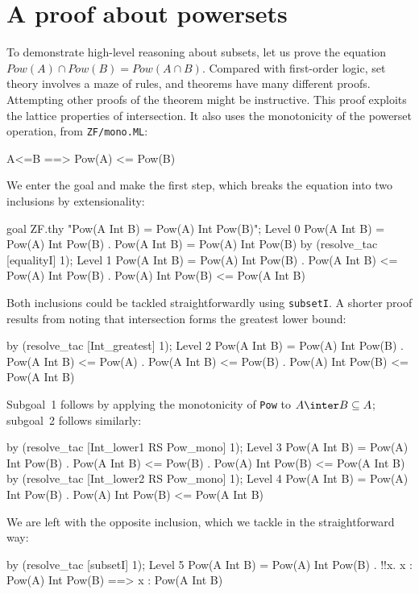 \section{A proof about powersets}
To demonstrate high-level reasoning about subsets, let us prove the equation
${Pow(A)\cap Pow(B)}= Pow(A\cap B)$.  Compared with first-order logic, set
theory involves a maze of rules, and theorems have many different proofs.
Attempting other proofs of the theorem might be instructive.  This proof
exploits the lattice properties of intersection.  It also uses the
monotonicity of the powerset operation, from {\tt ZF/mono.ML}:
\begin{ttbox}
      A<=B ==> Pow(A) <= Pow(B)
\end{ttbox}
We enter the goal and make the first step, which breaks the equation into
two inclusions by extensionality:
\begin{ttbox}
goal ZF.thy "Pow(A Int B) = Pow(A) Int Pow(B)";
{\out Level 0}
{\out Pow(A Int B) = Pow(A) Int Pow(B)}
{. Pow(A Int B) = Pow(A) Int Pow(B)}
by (resolve_tac [equalityI] 1);
{\out Level 1}
{\out Pow(A Int B) = Pow(A) Int Pow(B)}
{. Pow(A Int B) <= Pow(A) Int Pow(B)}
{. Pow(A) Int Pow(B) <= Pow(A Int B)}
\end{ttbox}
Both inclusions could be tackled straightforwardly using {\tt subsetI}.
A shorter proof results from noting that intersection forms the greatest
lower bound:
\begin{ttbox}
by (resolve_tac [Int_greatest] 1);
{\out Level 2}
{\out Pow(A Int B) = Pow(A) Int Pow(B)}
{. Pow(A Int B) <= Pow(A)}
{. Pow(A Int B) <= Pow(B)}
{. Pow(A) Int Pow(B) <= Pow(A Int B)}
\end{ttbox}
Subgoal~1 follows by applying the monotonicity of {\tt Pow} to $A\inter
B\subseteq A$; subgoal~2 follows similarly:
\begin{ttbox}
by (resolve_tac [Int_lower1 RS Pow_mono] 1);
{\out Level 3}
{\out Pow(A Int B) = Pow(A) Int Pow(B)}
{. Pow(A Int B) <= Pow(B)}
{. Pow(A) Int Pow(B) <= Pow(A Int B)}
by (resolve_tac [Int_lower2 RS Pow_mono] 1);
{\out Level 4}
{\out Pow(A Int B) = Pow(A) Int Pow(B)}
{. Pow(A) Int Pow(B) <= Pow(A Int B)}
\end{ttbox}
We are left with the opposite inclusion, which we tackle in the
straightforward way:
\begin{ttbox}
by (resolve_tac [subsetI] 1);
{\out Level 5}
{\out Pow(A Int B) = Pow(A) Int Pow(B)}
{. !!x. x : Pow(A) Int Pow(B) ==> x : Pow(A Int B)}
\end{ttbox}
